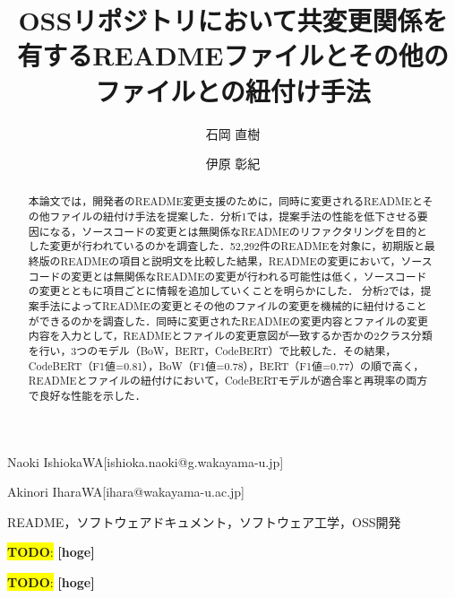 \documentclass[submit]{ipsj}
\newcommand{\todo}[1]{\colorbox{yellow}{{\bf TODO}:}{\color{red} {\textbf{[#1]}}}}
\begin{document}
\title{OSSリポジトリにおいて共変更関係を有するREADMEファイルとその他のファイルとの紐付け手法}





\author{石岡 直樹}{Naoki Ishioka}{WA}[ishioka.naoki@g.wakayama-u.jp]
\author{伊原 彰紀}{Akinori Ihara}{WA}[ihara@wakayama-u.ac.jp]

\begin{abstract}
本論文では，開発者のREADME変更支援のために，同時に変更されるREADMEとその他ファイルの紐付け手法を提案した．分析1では，提案手法の性能を低下させる要因になる，ソースコードの変更とは無関係なREADMEのリファクタリングを目的とした変更が行われているのかを調査した．52,292件のREADMEを対象に，初期版と最終版のREADMEの項目と説明文を比較した結果，READMEの変更において，ソースコードの変更とは無関係なREADMEの変更が行われる可能性は低く，ソースコードの変更とともに項目ごとに情報を追加していくことを明らかにした．
分析2では，提案手法によってREADMEの変更とその他のファイルの変更を機械的に紐付けることができるのかを調査した．同時に変更されたREADMEの変更内容とファイルの変更内容を入力として，READMEとファイルの変更意図が一致するか否かの2クラス分類を行い，3つのモデル（BoW，BERT，CodeBERT）で比較した．その結果，CodeBERT（F1値=0.81），BoW（F1値=0.78），BERT（F1値=0.77）の順で高く，READMEとファイルの紐付けにおいて，CodeBERTモデルが適合率と再現率の両方で良好な性能を示した．
\end{abstract}


\begin{jkeyword}
README，ソフトウェアドキュメント，ソフトウェア工学，OSS開発
\end{jkeyword}

\begin{eabstract}
\todo{hoge}
\end{eabstract}

\begin{ekeyword}
\todo{hoge}
\end{ekeyword}

\maketitle
\end{document}
